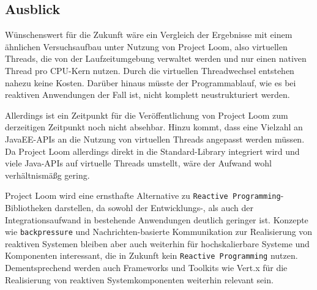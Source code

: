 \subsection{Ausblick}
\label{subsec:ausblick}
Wünschenswert für die Zukunft wäre ein Vergleich der Ergebnisse mit einem ähnlichen Versuchsaufbau unter Nutzung von Project Loom,
also virtuellen Threads, die von der Laufzeitumgebung verwaltet werden und nur einen nativen Thread pro CPU-Kern nutzen.
Durch die virtuellen Threadwechsel entstehen nahezu keine Kosten. Darüber hinaus müsste der Programmablauf, wie es bei reaktiven Anwendungen
der Fall ist, nicht komplett neustrukturiert werden.

Allerdings ist ein Zeitpunkt für die Veröffentlichung von Project Loom zum derzeitigen Zeitpunkt noch nicht absehbar.
Hinzu kommt, dass eine Vielzahl an JavaEE-APIs an die Nutzung von virtuellen Threads angepasst werden müssen.
Da Project Loom allerdings direkt in die Standard-Library
integriert wird und viele Java-APIs auf virtuelle Threads umstellt, wäre der Aufwand wohl verhältnismäßg gering.

Project Loom wird eine ernsthafte Alternative zu \verb|Reactive Programming|-Bibliotheken darstellen, da sowohl der Entwicklungs-, als auch
der Integrationsaufwand in bestehende Anwendungen deutlich geringer ist.
Konzepte wie \verb|backpressure| und Nachrichten-basierte Kommunikation zur Realisierung von reaktiven Systemen
bleiben aber auch weiterhin für hochskalierbare Systeme und Komponenten interessant, die in Zukunft kein \verb|Reactive Programming| nutzen.
Dementsprechend werden auch Frameworks und Toolkits wie Vert.x für die Realisierung von reaktiven Systemkomponenten weiterhin
relevant sein.